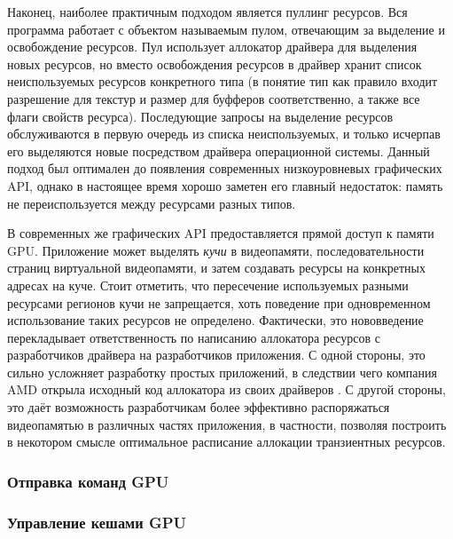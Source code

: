 Наконец, наиболее практичным подходом является пуллинг ресурсов.
Вся программа работает с объектом называемым пулом, отвечающим за выделение и освобождение ресурсов.
Пул использует аллокатор драйвера для выделения новых ресурсов, но вместо освобождения ресурсов в драйвер хранит список неиспользуемых ресурсов конкретного типа (в понятие тип как правило входит разрешение для текстур и размер для буфферов соответственно, а также все флаги свойств ресурса).
Последующие запросы на выделение ресурсов обслуживаются в первую очередь из списка неиспользуемых, и только исчерпав его выделяются новые посредством драйвера операционной системы.
Данный подход был оптимален до появления современных низкоуровневых графических API, однако в настоящее время хорошо заметен его главный недостаток: память не переиспользуется между ресурсами разных типов.

В современных же графических API предоставляется прямой доступ к памяти GPU.
Приложение может выделять \textit{кучи} в видеопамяти, последовательности страниц виртуальной видеопамяти, и затем создавать ресурсы на конкретных адресах на куче.
Стоит отметить, что пересечение используемых разными ресурсами регионов кучи не запрещается, хоть поведение при одновременном использование таких ресурсов не определено.
Фактически, это нововведение перекладывает ответственность по написанию аллокатора ресурсов с разработчиков драйвера на разработчиков приложения.
С одной стороны, это сильно усложняет разработку простых приложений, в следствии чего компания AMD открыла исходный код аллокатора из своих драйверов .
С другой стороны, это даёт возможность разработчикам более эффективно распоряжаться видеопамятью в различных частях приложения, в частности, позволяя построить в некотором смысле оптимальное расписание аллокации транзиентных ресурсов.

\subsubsection{Отправка команд GPU}

\subsubsection{Управление кешами GPU}

